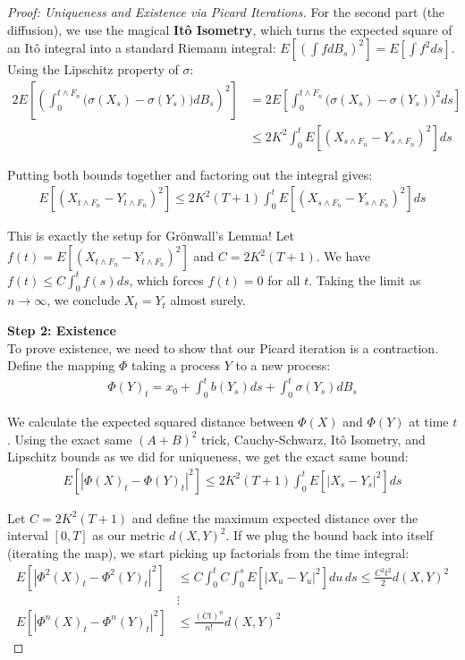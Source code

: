\begin{proof}[Proof: Uniqueness and Existence via Picard Iterations]
    For the second part (the diffusion), we use the magical \textbf{Itô Isometry}, which turns the expected square of an Itô integral into a standard Riemann integral: $E[(\int f dB_s)^2] = E[\int f^2 ds]$. Using the Lipschitz property of $\sigma$:
    \begin{align*}
        2 E \left[ \left( \int_0^{t \wedge F_n} \big(\sigma(X_s) - \sigma(Y_s)\big) dB_s \right)^2 \right] 
        &= 2 E \left[ \int_0^{t \wedge F_n} \big(\sigma(X_s) - \sigma(Y_s)\big)^2 ds \right] \\
        &\leq 2 K^2 \int_0^t E \left[ (X_{s \wedge F_n} - Y_{s \wedge F_n})^2 \right] ds
    \end{align*}

    Putting both bounds together and factoring out the integral gives:
    \begin{align*}
        E\left[(X_{t \wedge F_n} - Y_{t \wedge F_n})^2\right] \leq 2 K^2 (T + 1) \int_0^t E \left[ (X_{s \wedge F_n} - Y_{s \wedge F_n})^2 \right] ds
    \end{align*}

    This is exactly the setup for Grönwall's Lemma! Let $f(t) = E[(X_{t \wedge F_n} - Y_{t \wedge F_n})^2]$ and $C = 2 K^2 (T + 1)$. We have $f(t) \leq C \int_0^t f(s) ds$, which forces $f(t) = 0$ for all $t$. Taking the limit as $n \to \infty$, we conclude $X_t = Y_t$ almost surely.

    \vspace{1em}
    \textbf{Step 2: Existence} \\
    To prove existence, we need to show that our Picard iteration is a contraction. Define the mapping $\Phi$ taking a process $Y$ to a new process:
    \begin{align*}
        \Phi(Y)_t = x_0 + \int_0^t b(Y_s) ds + \int_0^t \sigma(Y_s) d B_s
    \end{align*}

    We calculate the expected squared distance between $\Phi(X)$ and $\Phi(Y)$ at time $t$. Using the exact same $(A+B)^2$ trick, Cauchy-Schwarz, Itô Isometry, and Lipschitz bounds as we did for uniqueness, we get the exact same bound:
    \begin{align*}
        E\left[|\Phi(X)_t - \Phi(Y)_t|^2\right] \leq 2 K^2 (T + 1) \int_0^t E\left[|X_s - Y_s|^2\right] ds
    \end{align*}

    Let $C = 2 K^2 (T + 1)$ and define the maximum expected distance over the interval $[0, T]$ as our metric $d(X,Y)^2$. If we plug the bound back into itself (iterating the map), we start picking up factorials from the time integral:
    \begin{align*}
        E\left[|\Phi^2(X)_t - \Phi^2(Y)_t|^2\right] &\leq C \int_0^t C \int_0^s E\left[|X_u - Y_u|^2\right] du \, ds \leq \frac{C^2 t^2}{2} d(X, Y)^2 \\
        &\vdots \\
        E\left[|\Phi^n(X)_t - \Phi^n(Y)_t|^2\right] &\leq \frac{(C t)^n}{n!} d(X, Y)^2
    \end{align*}
    

\end{proof}
